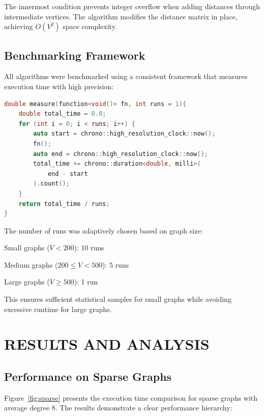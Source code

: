 \documentclass[12pt, a4paper]{report}
\begin{document}
The innermost condition prevents integer overflow when adding distances through intermediate vertices. The algorithm modifies the distance matrix in place, achieving $O(V^2)$ space complexity.

\section{Benchmarking Framework}

All algorithms were benchmarked using a consistent framework that measures execution time with high precision:

\begin{lstlisting}[language=C++, caption={Benchmark measurement function}]
double measure(function<void()> fn, int runs = 1){
    double total_time = 0.0;
    for (int i = 0; i < runs; i++) {
        auto start = chrono::high_resolution_clock::now();
        fn();
        auto end = chrono::high_resolution_clock::now();
        total_time += chrono::duration<double, milli>(
            end - start
        ).count();
    }
    return total_time / runs;
}
\end{lstlisting}

The number of runs was adaptively chosen based on graph size:
\begin{dashenum}
  \item Small graphs ($V < 200$): 10 runs
  \item Medium graphs ($200 \leq V < 500$): 5 runs
  \item Large graphs ($V \geq 500$): 1 run
\end{dashenum}

This ensures sufficient statistical samples for small graphs while avoiding excessive runtime for large graphs.

\chapter{RESULTS AND ANALYSIS}

\section{Performance on Sparse Graphs}

Figure~\ref{fig:sparse} presents the execution time comparison for sparse graphs with average degree 8. The results demonstrate a clear performance hierarchy:
\end{document}
